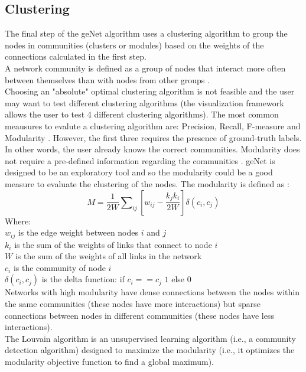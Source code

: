 \documentclass{article}
\begin{document}

\newpage
\subsection{Clustering}
The final step of the geNet algorithm uses a clustering algorithm to group the nodes in communities (clusters or modules) based on the weights of the connections calculated in the first step.\\
A network community is defined as a group of nodes that interact more often between themselves than with nodes from other groups \cite{Linhares2020}.\\
Choosing an "absolute" optimal clustering algorithm is not feasible and the user may want to test different clustering algorithms (the visualization framework allows the user to test 4 different clustering algorithms).
The most common meausures to evalute a clustering algorithm are: Precision, Recall, F-measure and Modularity \cite{Linhares2020}.
However, the first three requires the presence of ground-truth labels. In other words, the user already knows the correct communities.  Modularity does not require a pre-defined information regarding the communities \cite{Linhares2020}. geNet is designed to be an exploratory tool and so the modularity could be a good measure to evaluate the clustering of the nodes. The modularity is defined as \cite{Linhares2020}:\\
\begin{equation}
M=\frac{1}{2W} \sum\nolimits_{ij}[w_{ij} - \frac{k_{j}k_{i}}{2W}]\delta(c_i,c_j)
\end{equation}
Where:\\
$w_{ij}$ is the edge weight between nodes $i$ and $j$\\
$k_i$ is the sum of the weights of links that connect to node $i$ \\
$W$ is the sum of the weights of all links in the network\\
$c_i$ is the community of node $i$\\
$\delta(c_i,c_j)$ is the delta function: if $c_i==c_j$ $1$ else $0$\\
Networks with high modularity have dense connections between the nodes within the same communities (these nodes have more interactions) but sparse connections between nodes in different communities (these nodes have less interactions).\\
The Louvain algorithm is an unsupervised learning algorithm (i.e., a community detection algorithm) designed to maximize the modularity (i.e., it optimizes the modularity objective function to find a global maximum).\\
\end{document}
